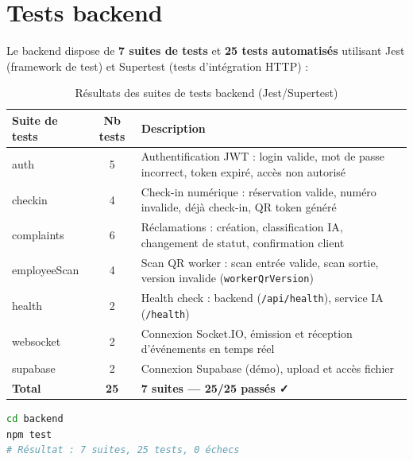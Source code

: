 
\section{Tests backend}
\label{sec:tests_backend}

Le backend dispose de \textbf{7 suites de tests} et \textbf{25 tests automatisés} utilisant Jest (framework de test) et Supertest (tests d'intégration HTTP) :

\begin{table}[H]
\centering
\caption{Résultats des suites de tests backend (Jest/Supertest)}
\label{tab:tests_backend}
\begin{tabular}{|l|c|l|}
\hline
\textbf{Suite de tests} & \textbf{Nb tests} & \textbf{Description} \\
\hline
auth & 5 & Authentification JWT : login valide, mot de passe incorrect, token expiré, accès non autorisé \\
\hline
checkin & 4 & Check-in numérique : réservation valide, numéro invalide, déjà check-in, QR token généré \\
\hline
complaints & 6 & Réclamations : création, classification IA, changement de statut, confirmation client \\
\hline
employeeScan & 4 & Scan QR worker : scan entrée valide, scan sortie, version invalide (\texttt{workerQrVersion}) \\
\hline
health & 2 & Health check : backend (\texttt{/api/health}), service IA (\texttt{/health}) \\
\hline
websocket & 2 & Connexion Socket.IO, émission et réception d'événements en temps réel \\
\hline
supabase & 2 & Connexion Supabase (démo), upload et accès fichier \\
\hline
\textbf{Total} & \textbf{25} & \textbf{7 suites — 25/25 passés ✓} \\
\hline
\end{tabular}
\end{table}

\begin{lstlisting}[language=bash, caption={Exécution de la suite de tests backend}]
cd backend
npm test
# Résultat : 7 suites, 25 tests, 0 échecs
\end{lstlisting}


